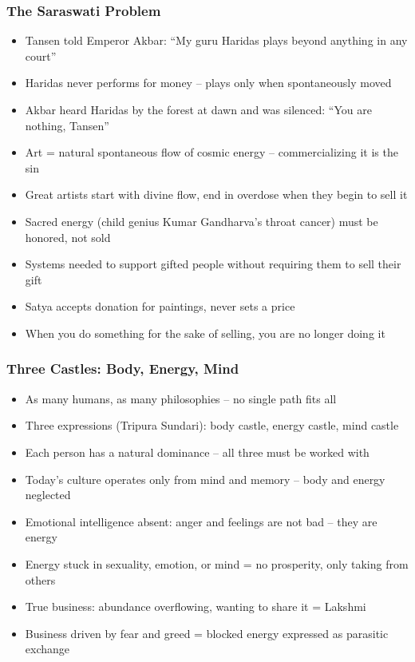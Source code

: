 \begin{frame}[fragile]\frametitle{The Saraswati Problem}
  \begin{itemize}
    \item Tansen told Emperor Akbar: ``My guru Haridas plays beyond anything in any court''
    \item Haridas never performs for money -- plays only when spontaneously moved
    \item Akbar heard Haridas by the forest at dawn and was silenced: ``You are nothing, Tansen''
    \item Art = natural spontaneous flow of cosmic energy -- commercializing it is the sin
    \item Great artists start with divine flow, end in overdose when they begin to sell it
    \item Sacred energy (child genius Kumar Gandharva's throat cancer) must be honored, not sold
    \item Systems needed to support gifted people without requiring them to sell their gift
    \item Satya accepts donation for paintings, never sets a price
    \item When you do something for the sake of selling, you are no longer doing it
  \end{itemize}
\end{frame}

\begin{frame}[fragile]\frametitle{Three Castles: Body, Energy, Mind}
  \begin{itemize}
    \item As many humans, as many philosophies -- no single path fits all
    \item Three expressions (Tripura Sundari): body castle, energy castle, mind castle
    \item Each person has a natural dominance -- all three must be worked with
    \item Today's culture operates only from mind and memory -- body and energy neglected
    \item Emotional intelligence absent: anger and feelings are not bad -- they are energy
    \item Energy stuck in sexuality, emotion, or mind = no prosperity, only taking from others
    \item True business: abundance overflowing, wanting to share it = Lakshmi
    \item Business driven by fear and greed = blocked energy expressed as parasitic exchange
  \end{itemize}
\end{frame}

